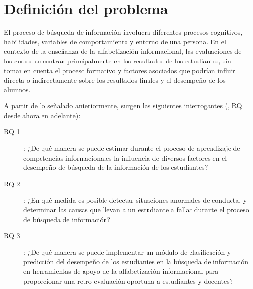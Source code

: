 \section{Definición del problema}
\label{sec:definicion_problema}
El proceso de búsqueda de información involucra diferentes procesos cognitivos, habilidades, variables de comportamiento y entorno de una persona. En el contexto de la enseñanza de la alfabetización informacional, las evaluaciones de los cursos se centran principalmente en los resultados de los estudiantes, sin tomar en cuenta el proceso formativo y factores asociados que podrían influir directa o indirectamente sobre los resultados finales y el desempeño de los alumnos.  

A partir de lo señalado anteriormente, surgen las siguientes interrogantes (, RQ desde ahora en adelante):

\begin{description}
	\item [RQ 1]: ¿De qué manera se puede estimar durante el proceso de aprendizaje de competencias informacionales la influencia de diversos factores en el desempeño de búsqueda de la información de los estudiantes?
	\item [RQ 2]: ¿En qué medida es posible detectar situaciones anormales de conducta, y determinar las causas que llevan a un estudiante a fallar durante el proceso de búsqueda de información? 
	\item [RQ 3]: ¿De qué manera se puede implementar un módulo de clasificación y predicción del desempeño de los estudiantes en la búsqueda de información en herramientas de apoyo de la alfabetización informacional para proporcionar una retro evaluación oportuna a estudiantes y docentes?
\end{description}
